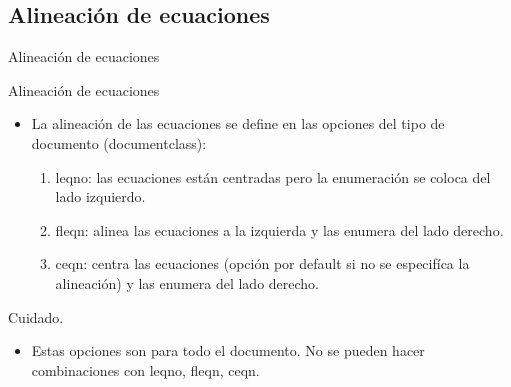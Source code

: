 \documentclass[aspectratio=169, 10pt]{beamer}
\begin{document}
\subsection{Alineación de ecuaciones}
\begin{frame}{Alineación de ecuaciones}
    \begin{exampleblock}{Alineación de ecuaciones}
        \begin{itemize}
            \item La alineación de las ecuaciones se define en las opciones del tipo de documento (documentclass):
            \begin{enumerate}
                \item leqno: las ecuaciones están centradas pero la enumeración se coloca del lado izquierdo.
  
                \item fleqn: alinea las ecuaciones a la izquierda y las enumera del lado derecho.


                \item ceqn: centra las ecuaciones (opción por default si no se especifíca la alineación) y las enumera del lado derecho.
            \end{enumerate}
            
        \end{itemize}
    \end{exampleblock}

\begin{alertblock}{Cuidado.}
    \begin{itemize}
        \item Estas opciones son para todo el documento. No se pueden hacer combinaciones con leqno, fleqn, ceqn.
    \end{itemize}
    
\end{alertblock}
\end{frame}
\end{document}
